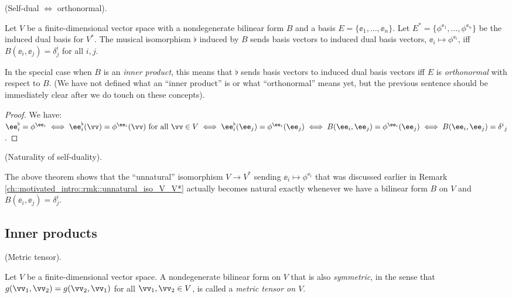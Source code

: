 \begin{theorem}
     (Self-dual $\iff$ orthonormal).
     
     Let $V$ be a finite-dimensional vector space with a nondegenerate bilinear form $B$ and a basis $E = \{\ee_1, ..., \ee_n\}$. Let $E^* = \{\phi^{\ee_1}, ..., \phi^{\ee_n}\}$ be the induced dual basis for $V^*$. The musical isomorphism $\flat$ induced by $B$ sends basis vectors to induced dual basis vectors, $\ee_i \mapsto \phi^{\ee_i}$, iff $B(\ee_i, 
     \ee_j) = \delta^i_j$ for all $i, j$. 
     
     In the special case when $B$ is an \textit{inner product}, this means that $\flat$ sends basis vectors to induced dual basis vectors iff $E$ is \textit{orthonormal} with respect to $B$. (We have not defined what an ``inner product'' is or what ``orthonormal'' means yet, but the previous sentence should be immediately clear after we do touch on these concepts).
\end{theorem}

\begin{proof}
    We have: $\ee_i^\flat = \phi^{\ee_i} \iff \ee_i^\flat(\vv) = \phi^{\ee_i}(\vv) \text{ for all $\vv \in V$} \iff \ee_i^\flat(\ee_j) = \phi^{\ee_i}(\ee_j) \iff B(\ee_i, \ee_j) = \phi^{\ee_i}(\ee_j) \iff B(\ee_i, \ee_j) = \delta^i{}_j$.
\end{proof}

\begin{remark}
\label{ch::bilinear_forms_metric_tensors::thm::musical_iso_unique_self_dual_iso}
    (Naturality of self-duality).

    The above theorem shows that the ``unnatural'' isomorphism $V \rightarrow V^*$ sending $\ee_i \mapsto \phi^{\ee_i}$ that was discussed earlier in Remark \ref{ch::motivated_intro::rmk::unnatural_iso_V_V*} actually becomes natural exactly whenever we have a bilinear form $B$ on $V$ and $B(\ee_i, \ee_j) = \delta^i_j$.
\end{remark}

\subsection*{Inner products}

\begin{defn}
    (Metric tensor).
    
    Let $V$ be a finite-dimensional vector space. A nondegenerate bilinear form on $V$ that is also \textit{symmetric}, in the sense that $g(\vv_1, \vv_2) = g(\vv_2, \vv_1)$ for all $\vv_1, \vv_2 \in V$, is called a \textit{metric tensor on $V$}.
\end{defn}

